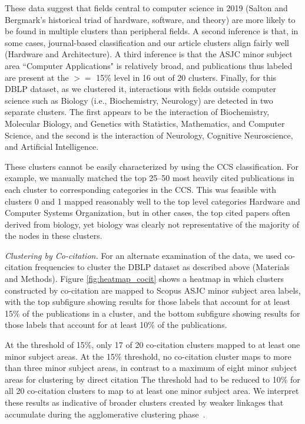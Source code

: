These data suggest that fields central to computer science in 2019 (Salton and Bergmark's historical triad of hardware, software, and theory) are more likely to be found in multiple clusters than peripheral fields. A second inference is that, in some cases, journal-based classification and our article clusters align fairly well (Hardware and Architecture). 
A third inference is that the ASJC minor subject area ``Computer Applications" is relatively broad, and publications thus labeled are present at the $>=$ 15\% level in 16 out of 20 clusters.  Finally,   for this DBLP dataset, as we clustered it, interactions with fields outside computer science such as Biology  (i.e., Biochemistry, Neurology)  are  detected in two separate clusters. The first appears to be the interaction of Biochemistry, Molecular Biology, and Genetics with Statistics, Mathematics, and Computer Science, and the second is the interaction of Neurology, Cognitive Neuroscience, and Artificial Intelligence.

These clusters cannot be easily characterized by using the CCS classification. For example, we manually matched the top 25--50 most heavily cited publications in each cluster to corresponding categories in the CCS. This was feasible with clusters 0 and 1 mapped reasonably well to the top level categories Hardware and Computer Systems Organization, but in other cases, the top cited papers often derived from biology, yet biology was clearly not  representative of the majority of the nodes in these clusters. 

\emph{Clustering by Co-citation.} For an alternate examination of the data, we used co-citation frequencies to cluster the DBLP dataset as described above (Materials and Methods). Figure \ref{fig:heatmap_cocit} shows a heatmap in which clusters constructed by co-citation are mapped to Scopus ASJC minor subject area labels, with the top subfigure showing results for those labels that account for at least 15\% of the publications in a cluster, and the bottom subfigure showing results for those labels that account for at least 10\% of the publications. 

At the threshold of 15\%, only 17 of 20 co-citation clusters mapped to at least one minor subject areas. At the 15\% threshold, no co-citation cluster maps to more than three minor subject areas, in contrast to a maximum of eight minor subject areas for clustering by direct citation  The threshold had to be reduced to 10\% for all 20 co-citation clusters to map to at least one minor subject area. We interpret these results as indicative of broader clusters created by weaker linkages that accumulate during the agglomerative clustering phase~\cite{small_clustering_1985}. 

